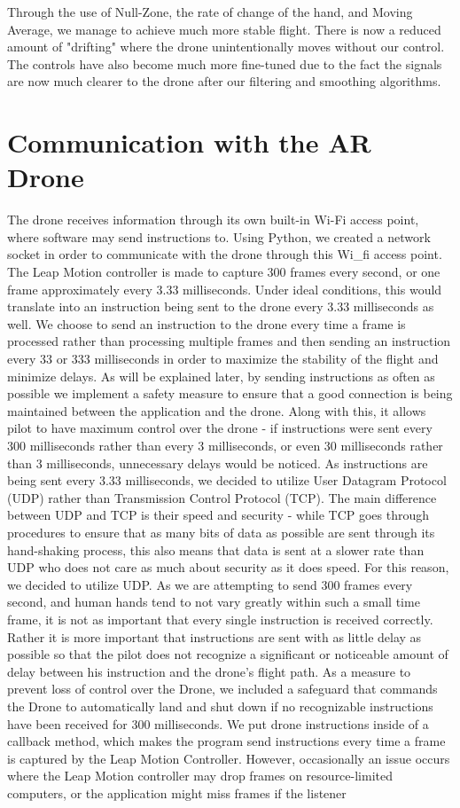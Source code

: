 \documentclass[letterpaper,english, 12pt]{article}
\begin{document}
Through the use of Null-Zone, the rate of change of the hand, and Moving Average, we manage to achieve much more stable flight.  There is now a reduced amount of "drifting" where the drone unintentionally moves without our control.  The controls have also become much more fine-tuned due to the fact the signals are now much clearer to the drone after our filtering and smoothing algorithms.  

\section*{Communication with the AR Drone}

The drone receives information through its own built-in Wi-Fi access point, where software may send instructions to. Using Python, we created a network socket in order to communicate with the drone through this Wi_fi access point. The Leap Motion controller is made to capture 300 frames every second, or one frame approximately every 3.33 milliseconds. Under ideal conditions, this would translate into an instruction being sent to the drone every 3.33 milliseconds as well. We choose to send an instruction to the drone every time a frame is processed rather than processing multiple frames and then sending an instruction every 33 or 333 milliseconds in order to maximize the stability of the flight and minimize delays. As will be explained later, by sending instructions as often as possible we implement a safety measure to ensure that a good connection is being maintained between the application and the drone. Along with this, it allows pilot to have maximum control over the drone - if instructions were sent every 300 milliseconds rather than every 3 milliseconds, or even 30 milliseconds rather than 3 milliseconds, unnecessary delays would be noticed. As instructions are being sent every 3.33 milliseconds, we decided to utilize User Datagram Protocol (UDP) rather than Transmission Control Protocol (TCP). The main difference between UDP and TCP is their speed and security - while TCP goes through procedures to ensure that as many bits of data as possible are sent through its hand-shaking process, this also means that data is sent at a slower rate than UDP who does not care as much about security as it does speed. For this reason, we decided to utilize UDP. As we are attempting to send 300 frames every second, and human hands tend to not vary greatly within such a small time frame, it is not as important that every single instruction is received correctly. Rather it is more important that instructions are sent with as little delay as possible so that the pilot does not recognize a significant or noticeable amount of delay between his instruction and the drone's flight path. As a measure to prevent loss of control over the Drone, we included a safeguard that commands the Drone to automatically land and shut down if no recognizable instructions have been received for 300 milliseconds. We put drone instructions inside of a callback method, which makes the program send instructions every time a frame is captured by the Leap Motion Controller. However, occasionally an issue occurs where the Leap Motion controller may drop frames on resource-limited computers, or the application might miss frames if the listener 
\end{document}
